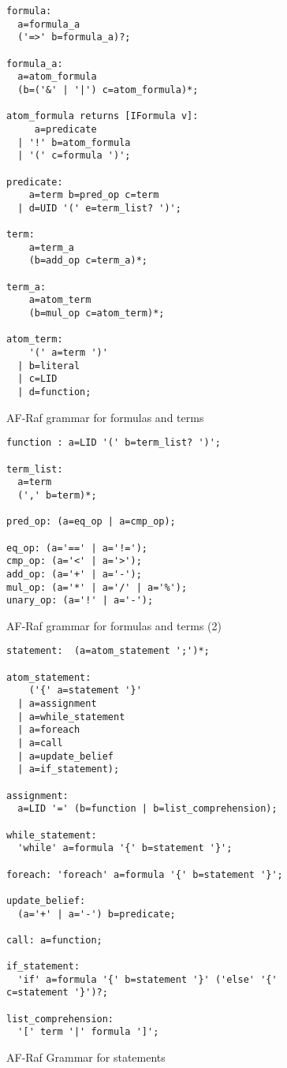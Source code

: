 \documentclass[a4paper,12pt,oneside,fleqn]{book} %
\theoremstyle{plain}
\theoremstyle{definition}
\theoremstyle{remark}
\begin{document}
\begin{figure}\footnotesize %
\begin{verbatim}
formula:
  a=formula_a 
  ('=>' b=formula_a)?;

formula_a:
  a=atom_formula  
  (b=('&' | '|') c=atom_formula)*;

atom_formula returns [IFormula v]:
     a=predicate 
  | '!' b=atom_formula 
  | '(' c=formula ')';

predicate:
    a=term b=pred_op c=term  
  | d=UID '(' e=term_list? ')';

term:
    a=term_a   
    (b=add_op c=term_a)*;

term_a:
    a=atom_term  
    (b=mul_op c=atom_term)*;

atom_term:
    '(' a=term ')' 
  | b=literal 
  | c=LID 
  | d=function;

\end{verbatim}
\caption{AF-Raf grammar for formulas and terms}
\label{fig:Grammar-formulas-terms1}
\end{figure} %

\begin{figure}\footnotesize %
\begin{verbatim}
function : a=LID '(' b=term_list? ')';

term_list:
  a=term 
  (',' b=term)*;

pred_op: (a=eq_op | a=cmp_op);

eq_op: (a='==' | a='!=');
cmp_op: (a='<' | a='>');
add_op: (a='+' | a='-');
mul_op: (a='*' | a='/' | a='%');
unary_op: (a='!' | a='-');
\end{verbatim}
\caption{AF-Raf grammar for formulas and terms (2)}
\label{fig:Grammar-formulas-terms2}
\end{figure} %

\begin{figure}\footnotesize %
\begin{verbatim}
statement:  (a=atom_statement ';')*;

atom_statement:
    ('{' a=statement '}'
  | a=assignment
  | a=while_statement
  | a=foreach
  | a=call
  | a=update_belief
  | a=if_statement);

assignment: 
  a=LID '=' (b=function | b=list_comprehension);

while_statement: 
  'while' a=formula '{' b=statement '}';

foreach: 'foreach' a=formula '{' b=statement '}';

update_belief: 
  (a='+' | a='-') b=predicate;

call: a=function;

if_statement: 
  'if' a=formula '{' b=statement '}' ('else' '{' c=statement '}')?;

list_comprehension: 
  '[' term '|' formula ']';
\end{verbatim}
\caption{AF-Raf Grammar for statements}
\label{fig:Grammar-statements}
\end{figure} %
\end{document}
